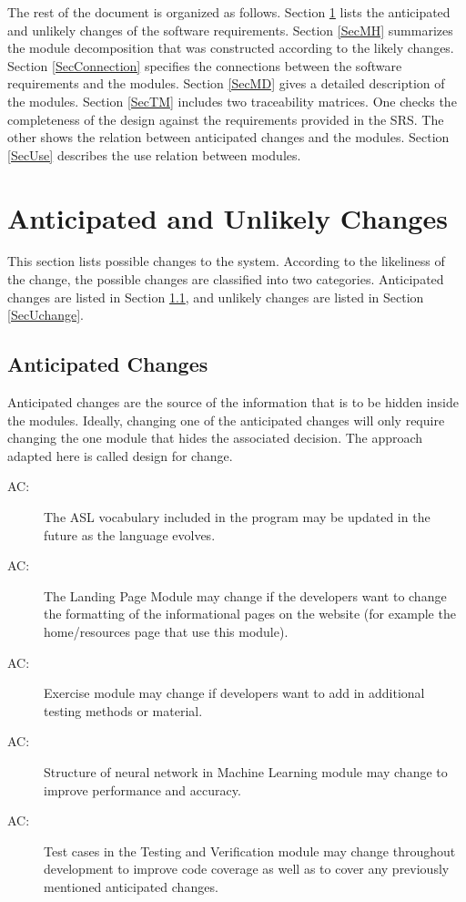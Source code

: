 \documentclass[12pt, titlepage]{article}
\newcounter{acnum}
\newcommand{\actheacnum}{AC\theacnum}
\begin{document}
The rest of the document is organized as follows. Section
\ref{SecChange} lists the anticipated and unlikely changes of the software
requirements. Section \ref{SecMH} summarizes the module decomposition that
was constructed according to the likely changes. Section \ref{SecConnection}
specifies the connections between the software requirements and the
modules. Section \ref{SecMD} gives a detailed description of the
modules. Section \ref{SecTM} includes two traceability matrices. One checks
the completeness of the design against the requirements provided in the SRS. The
other shows the relation between anticipated changes and the modules. Section
\ref{SecUse} describes the use relation between modules.

\section{Anticipated and Unlikely Changes} \label{SecChange}

This section lists possible changes to the system. According to the likeliness
of the change, the possible changes are classified into two
categories. Anticipated changes are listed in Section \ref{SecAchange}, and
unlikely changes are listed in Section \ref{SecUchange}.

\subsection{Anticipated Changes} \label{SecAchange}

Anticipated changes are the source of the information that is to be hidden
inside the modules. Ideally, changing one of the anticipated changes will only
require changing the one module that hides the associated decision. The approach
adapted here is called design for
change.

\begin{description}
\item[ \actheacnum \label{acInfo}:] The ASL vocabulary included in the program may be updated in the future as the language evolves.
\item[ \actheacnum \label{acAbout}:] The Landing Page Module may change if the developers want to change the formatting of the informational pages on the website (for example the home/resources page that use this module). 
\item[ \actheacnum \label{acExercise}:] Exercise module may change if developers want to add in additional testing methods or material.
\item[ \actheacnum \label{acMLModel}:] Structure of neural network in Machine Learning module may change to improve performance and accuracy.
\item[ \actheacnum \label{acTestVerif}:] Test cases in the Testing and Verification module may change throughout development to improve code coverage as well as to cover any previously mentioned anticipated changes.
\end{description}
\end{document}
